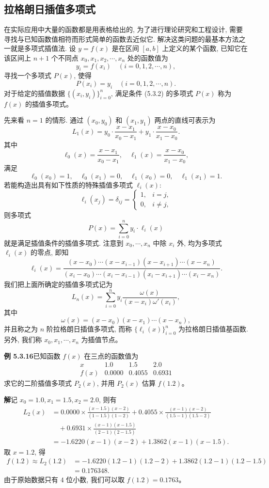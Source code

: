 \documentclass[UTF8,12pt,a4paper,fontset=fandol]{ctexart}
\begin{document}
\subsection{拉格朗日插值多项式}

在实际应用中大量的函数都是用表格给出的, 为了进行理论研究和工程设计, 需要寻找与已知函数值相符而形式简单的函数去近似它. 解决这类问题的最基本方法之一就是多项式插值法. 设 $y=f(x)$ 是在区间 $[a,b]$ 上定义的某个函数, 已知它在该区间上 $n+1$ 个不同点 $x_0,x_1,x_2,\cdots,x_n$ 处的函数值为
\[
  y_i=f(x_i)\quad (i=0,1,2,\cdots,n),
\]
寻找一个多项式 $P(x)$, 使得
\[
  P(x_i)=y_i\quad (i=0,1,2,\cdots,n).
  \tag{5.3.2}
\]
对于给定的插值数据 $\{(x_i,y_i)\}_{i=0}^n$, 满足条件 (5.3.2) 的多项式 $P(x)$ 称为 $f(x)$ 的插值多项式。

先来看 $n=1$ 的情形. 通过 $(x_0,y_0)$ 和 $(x_1,y_1)$ 两点的直线可表示为
\[
  L_1(x)=y_0\cdot\frac{x-x_1}{x_0-x_1}+y_1\cdot\frac{x-x_0}{x_1-x_0}.
\]
其中
\[
  \ell_0(x)=\frac{x-x_1}{x_0-x_1},\quad
  \ell_1(x)=\frac{x-x_0}{x_1-x_0},
\]
满足
\[
  \ell_0(x_0)=1,\quad \ell_0(x_1)=0,\quad \ell_1(x_0)=0,\quad \ell_1(x_1)=1.
\]
若能构造出具有如下性质的特殊插值多项式 $\ell_i(x)$:
\[
  \ell_i(x_j)=\delta_{ij}=
  \begin{cases}
    1, & i=j,\\
    0, & i\ne j,
  \end{cases}
\]
则多项式
\[
  P(x)=\sum_{i=0}^n y_i\cdot\ell_i(x)
\]
就是满足插值条件的插值多项式. 注意到 $x_0,\cdots,x_n$ 中除 $x_i$ 外, 均为多项式 $\ell_i(x)$ 的零点, 即知
\[
  \ell_i(x)
  =
  \frac{(x-x_0)\cdots(x-x_{i-1})(x-x_{i+1})\cdots(x-x_n)}
       {(x_i-x_0)\cdots(x_i-x_{i-1})(x_i-x_{i+1})\cdots(x_i-x_n)}.
\]
我们把上面所确定的插值多项式记为
\[
  L_n(x)=\sum_{i=0}^n y_i\frac{\omega(x)}{(x-x_i)\omega'(x_i)},
\]
其中
\[
  \omega(x)=(x-x_0)(x-x_1)\cdots(x-x_n),
  \tag{5.3.3}
\]
并且称之为 $n$ 阶拉格朗日插值多项式, 而称 $\{\ell_i(x)\}_{i=0}^n$ 为拉格朗日插值基函数. 另外, 我们称 $x_0,x_1,\cdots,x_n$ 为插值节点。

\noindent\textbf{例 5.3.16}\quad 已知函数 $f(x)$ 在三点的函数值为
\[
\begin{array}{c|ccc}
  x & 1.0 & 1.5 & 2.0\\
  \hline
  f(x) & 0.0000 & 0.4055 & 0.6931
\end{array}
\]
求它的二阶插值多项式 $P_2(x)$, 并用 $P_2(x)$ 估算 $f(1.2)$。

\noindent\textbf{解}\quad 记 $x_0=1.0,x_1=1.5,x_2=2.0$, 则有
\[
\begin{aligned}
  L_2(x)
  &=
  0.0000\times\frac{(x-1.5)(x-2)}{(1-1.5)(1-2)}
  +0.4055\times\frac{(x-1)(x-2)}{(1.5-1)(1.5-2)} \\
  &\quad
  +0.6931\times\frac{(x-1)(x-1.5)}{(2-1)(2-1.5)} \\
  &=
  -1.6220(x-1)(x-2)+1.3862(x-1)(x-1.5).
\end{aligned}
\]
取 $x=1.2$, 得
\[
\begin{aligned}
  f(1.2)\approx L_2(1.2)
  &=
  -1.6220(1.2-1)(1.2-2)
  +1.3862(1.2-1)(1.2-1.5) \\
  &=
  0.176348.
\end{aligned}
\]
由于原始数据只有 $4$ 位小数, 我们可以取 $f(1.2)=0.1763$。
\end{document}
